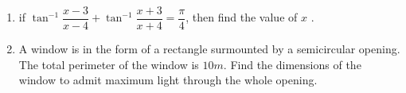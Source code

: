 \begin{enumerate}
\item if $\tan^{-1}\dfrac{x-3}{x-4} + \tan^{-1}\dfrac{x+3}{x+4} =\dfrac{\pi}{4}$, then find the value of $x$ .
\item A window is in the form of a rectangle surmounted by a semicircular opening. The total perimeter of the window is $10m$. Find the dimensions of the window to admit maximum light through the whole opening.
\end{enumerate}
